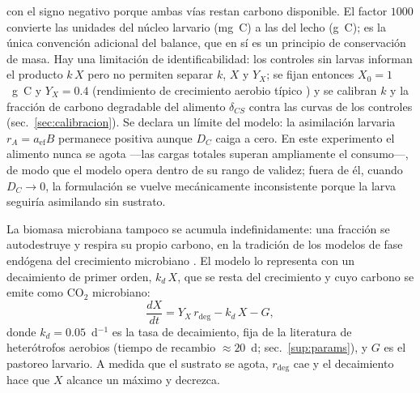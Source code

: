 con el signo negativo porque ambas v\'ias restan carbono disponible. El factor $1000$ convierte las unidades del n\'ucleo larvario (mg~C) a las del lecho (g~C); es la \'unica convenci\'on adicional del balance, que en s\'i es un principio de conservaci\'on de masa. Hay una limitaci\'on de identificabilidad: los controles sin larvas informan el producto $k\,X$ pero no permiten separar $k$, $X$ y $Y_X$; se fijan entonces $X_0 = 1$~g~C y $Y_X = 0.4$ (rendimiento de crecimiento aerobio t\'ipico \parencite{roels1980,shulerbioprocess2017}) y se calibran $k$ y la fracci\'on de carbono degradable del alimento $\delta_{CS}$ contra las curvas de los controles (sec.~\ref{sec:calibracion}). Se declara un l\'imite del modelo: la asimilaci\'on larvaria $r_A = a_{\mathrm{ef}}B$ permanece positiva aunque $D_C$ caiga a cero. En este experimento el alimento nunca se agota ---las cargas totales superan ampliamente el consumo---, de modo que el modelo opera dentro de su rango de validez; fuera de \'el, cuando $D_C \to 0$, la formulaci\'on se vuelve mec\'anicamente inconsistente porque la larva seguir\'ia asimilando sin sustrato.

La biomasa microbiana tampoco se acumula indefinidamente: una fracci\'on se autodestruye y respira su propio carbono, en la tradici\'on de los modelos de fase end\'ogena del crecimiento microbiano \parencite{henzeActivatedSludgeModels2015}. El modelo lo representa con un decaimiento de primer orden, $k_d\,X$, que se resta del crecimiento y cuyo carbono se emite como CO$_2$ microbiano:
\begin{equation}
  \frac{dX}{dt} = Y_X\,r_{\mathrm{deg}} - k_d\,X - G,
  \label{eq:balanceX}
\end{equation}
donde $k_d = 0.05$~d$^{-1}$ es la tasa de decaimiento, fija de la literatura de heter\'otrofos aerobios (tiempo de recambio $\approx 20$~d; sec.~\ref{sup:params}), y $G$ es el pastoreo larvario. A medida que el sustrato se agota, $r_{\mathrm{deg}}$ cae y el decaimiento hace que $X$ alcance un m\'aximo y decrezca.

